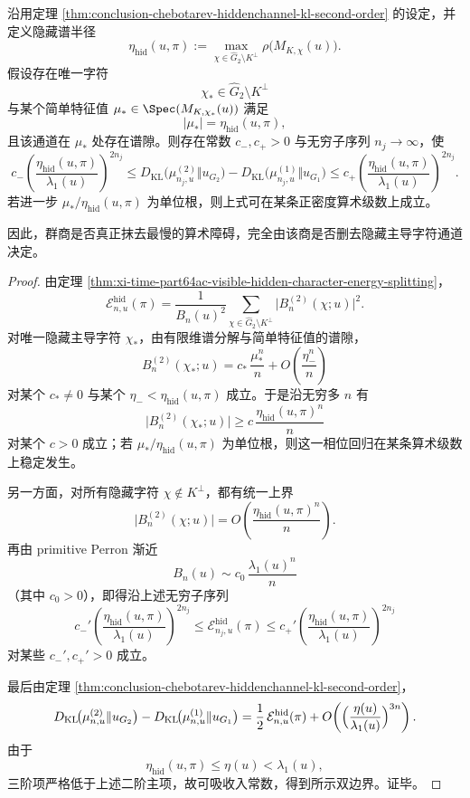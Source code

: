 \begin{theorem}[隐藏主导通道的熵障碍]\label{thm:conclusion-chebotarev-hiddenchannel-dominant-entropy-barrier}
沿用定理 \ref{thm:conclusion-chebotarev-hiddenchannel-kl-second-order} 的设定，并定义隐藏谱半径
\[
\eta_{\mathrm{hid}}(u,\pi)
:=
\max_{\chi\in \widehat G_2\setminus K^\perp}
\rho\!\bigl(M_{K,\chi}(u)\bigr).
\]
假设存在唯一字符
\[
\chi_\ast\in \widehat G_2\setminus K^\perp
\]
与某个简单特征值 \(\mu_\ast\in\Spec(M_{K,\chi_\ast}(u))\) 满足
\[
|\mu_\ast|=\eta_{\mathrm{hid}}(u,\pi),
\]
且该通道在 \(\mu_\ast\) 处存在谱隙。则存在常数 \(c_-,c_+>0\) 与无穷子序列 \(n_j\to\infty\)，使
\[
c_-\left(\frac{\eta_{\mathrm{hid}}(u,\pi)}{\lambda_1(u)}\right)^{2n_j}
\le
D_{\mathrm{KL}}\!\bigl(\mu_{n_j,u}^{(2)}\Vert u_{G_2}\bigr)
-
D_{\mathrm{KL}}\!\bigl(\mu_{n_j,u}^{(1)}\Vert u_{G_1}\bigr)
\le
c_+\left(\frac{\eta_{\mathrm{hid}}(u,\pi)}{\lambda_1(u)}\right)^{2n_j}.
\]
若进一步 \(\mu_\ast/\eta_{\mathrm{hid}}(u,\pi)\) 为单位根，则上式可在某条正密度算术级数上成立。

因此，群商是否真正抹去最慢的算术障碍，完全由该商是否删去隐藏主导字符通道决定。
\end{theorem}
\begin{proof}
由定理 \ref{thm:xi-time-part64ac-visible-hidden-character-energy-splitting}，
\[
\mathcal E_{n,u}^{\mathrm{hid}}(\pi)
=
\frac{1}{B_n(u)^2}
\sum_{\chi\in \widehat G_2\setminus K^\perp}
\bigl|B_n^{(2)}(\chi;u)\bigr|^2.
\]
对唯一隐藏主导字符 \(\chi_\ast\)，由有限维谱分解与简单特征值的谱隙，
\[
B_n^{(2)}(\chi_\ast;u)
=
c_\ast\,\frac{\mu_\ast^n}{n}
+
O\!\left(\frac{\eta_-^n}{n}\right)
\]
对某个 \(c_\ast\neq 0\) 与某个 \(\eta_-<\eta_{\mathrm{hid}}(u,\pi)\) 成立。于是沿无穷多 \(n\) 有
\[
\bigl|B_n^{(2)}(\chi_\ast;u)\bigr|
\ge
c\,\frac{\eta_{\mathrm{hid}}(u,\pi)^n}{n}
\]
对某个 \(c>0\) 成立；若 \(\mu_\ast/\eta_{\mathrm{hid}}(u,\pi)\) 为单位根，则这一相位回归在某条算术级数上稳定发生。

另一方面，对所有隐藏字符 \(\chi\notin K^\perp\)，都有统一上界
\[
\bigl|B_n^{(2)}(\chi;u)\bigr|
=
O\!\left(\frac{\eta_{\mathrm{hid}}(u,\pi)^n}{n}\right).
\]
再由 primitive Perron 渐近
\[
B_n(u)\sim c_0\,\frac{\lambda_1(u)^n}{n}
\]
（其中 \(c_0>0\)），即得沿上述无穷子序列
\[
c_-'\left(\frac{\eta_{\mathrm{hid}}(u,\pi)}{\lambda_1(u)}\right)^{2n_j}
\le
\mathcal E_{n_j,u}^{\mathrm{hid}}(\pi)
\le
c_+'\left(\frac{\eta_{\mathrm{hid}}(u,\pi)}{\lambda_1(u)}\right)^{2n_j}
\]
对某些 \(c_-',c_+'>0\) 成立。

最后由定理 \ref{thm:conclusion-chebotarev-hiddenchannel-kl-second-order}，
\[
D_{\mathrm{KL}}\!\bigl(\mu_{n,u}^{(2)}\Vert u_{G_2}\bigr)
-
D_{\mathrm{KL}}\!\bigl(\mu_{n,u}^{(1)}\Vert u_{G_1}\bigr)
=
\frac12\,\mathcal E_{n,u}^{\mathrm{hid}}(\pi)
+
O\!\left(\Bigl(\frac{\eta(u)}{\lambda_1(u)}\Bigr)^{3n}\right).
\]
由于
\[
\eta_{\mathrm{hid}}(u,\pi)\le \eta(u)<\lambda_1(u),
\]
三阶项严格低于上述二阶主项，故可吸收入常数，得到所示双边界。证毕。
\end{proof}

